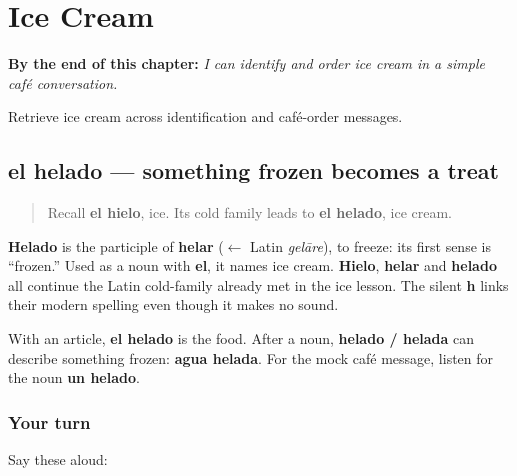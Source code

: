 
\chapter{Ice Cream}
\label{ch:helado}

\begin{chapteropening}
\textbf{By the end of this chapter:} \emph{I can identify and order ice cream in a simple café conversation.}

Retrieve ice cream across identification and café-order messages.
\end{chapteropening}

\section[el helado]{el helado — something frozen becomes a treat}

\label{lesson:ES-C411-helado}



\begin{quote}
Recall \textbf{el hielo}, ice. Its cold family leads to \textbf{el helado}, ice cream.
\end{quote}

\begin{cousinweb}
\textbf{Helado} is the participle of \textbf{helar} ($\leftarrow$ Latin \emph{gelāre}), to freeze: its first sense is “frozen.” Used as a noun with \textbf{el}, it names ice cream. \textbf{Hielo}, \textbf{helar} and \textbf{helado} all continue the Latin cold-family already met in the ice lesson. The silent \textbf{h} links their modern spelling even though it makes no sound.
\end{cousinweb}

\begin{grammarlens}[title={Grammar Lens: thing or description?}]
With an article, \textbf{el helado} is the food. After a noun, \textbf{helado / helada} can describe something frozen: \textbf{agua helada}. For the mock café message, listen for the noun \textbf{un helado}.
\end{grammarlens}

\subsection*{Your turn}
Say these aloud:

